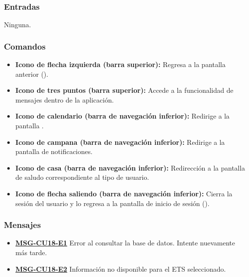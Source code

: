 \subsubsection{Entradas}
Ninguna.

\subsubsection{Comandos}
\begin{itemize}
	\item \textbf{Icono de flecha izquierda (barra superior):} Regresa a la pantalla anterior ().
	\item \textbf{Icono de tres puntos (barra superior):} Accede a la funcionalidad de mensajes dentro de la aplicación.
	\item \textbf{Icono de calendario (barra de navegación inferior):} Redirige a la pantalla .
	\item \textbf{Icono de campana (barra de navegación inferior):} Redirige a la pantalla de notificaciones.
	\item \textbf{Icono de casa (barra de navegación inferior):} Redirección a la pantalla de saludo correspondiente al tipo de usuario.
	\item \textbf{Icono de flecha saliendo (barra de navegación inferior):} Cierra la sesión del usuario y lo regresa a la pantalla de inicio de sesión ().
\end{itemize}

\subsubsection{Mensajes}
\begin{itemize}
	\item \textbf{\hyperref[msg:CU18-E1]{MSG-CU18-E1}} Error al consultar la base de datos. Intente nuevamente más tarde.
	\item \textbf{\hyperref[msg:CU18-E2]{MSG-CU18-E2}} Información no disponible para el ETS seleccionado.
\end{itemize}



